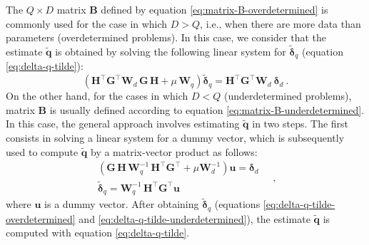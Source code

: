 The $Q \times D$ matrix $\mathbf{B}$ defined by equation \ref{eq:matrix-B-overdetermined} is commonly used for the case 
in which $D > Q$, i.e., when there are more data than parameters (overdetermined problems).
In this case, we consider that the estimate $\tilde{\mathbf{q}}$ is obtained by solving the following linear system
for $\tilde{\boldsymbol{\delta}}_{q}$ (equation \ref{eq:delta-q-tilde}):
\begin{equation}
	\left( \mathbf{H}^{\top} \mathbf{G}^{\top} \mathbf{W}_{d} \, \mathbf{G} \, \mathbf{H} + 
	\mu \, \mathbf{W}_{q} \right) 
	\tilde{\boldsymbol{\delta}}_{q} = 
	\mathbf{H}^{\top} \mathbf{G}^{\top} \mathbf{W}_{d} \: 
	\boldsymbol{\delta}_{d} \: .
	\label{eq:delta-q-tilde-overdetermined}
\end{equation}
On the other hand, for the cases in which $D < Q$ (underdetermined problems), matrix $\mathbf{B}$ is 
usually defined according to equation \ref{eq:matrix-B-underdetermined}. In this case, the general approach involves 
estimating $\tilde{\mathbf{q}}$ in two steps. The first consists in solving a linear system 
for a dummy vector, which is subsequently used to compute $\tilde{\mathbf{q}}$ by a matrix-vector product as follows:
\begin{equation}
	\begin{split}
		\left( \mathbf{G} \, \mathbf{H} \, \mathbf{W}_{q}^{-1} \,
		\mathbf{H}^{\top}\mathbf{G}^{\top} + \mu \mathbf{W}_{d}^{-1} \right)  
		\mathbf{u} = \boldsymbol{\delta}_{d} \\
		\tilde{\boldsymbol{\delta}}_{q} = \mathbf{W}_{q}^{-1} \, \mathbf{H}^{\top} \mathbf{G}^{\top} \mathbf{u}
	\end{split} \quad ,
	\label{eq:delta-q-tilde-underdetermined}
\end{equation}
where $\mathbf{u}$ is a dummy vector.
After obtaining $\tilde{\boldsymbol{\delta}}_{q}$ (equations \ref{eq:delta-q-tilde-overdetermined} and \ref{eq:delta-q-tilde-underdetermined}),
the estimate $\tilde{\mathbf{q}}$ is computed with equation \ref{eq:delta-q-tilde}.

